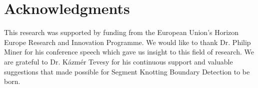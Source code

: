 \section{Acknowledgments}
\label{sec:acknowledgments}

This research was supported by funding from the European Union's Horizon Europe Research and Innovation Programme. We would like to thank Dr. Philip Miner for his conference speech which gave us insight to this field of research. We are grateful to Dr. Kázmér Tevesy for his continuous support and valuable suggestions that made possible for Segment Knotting Boundary Detection to be born.
